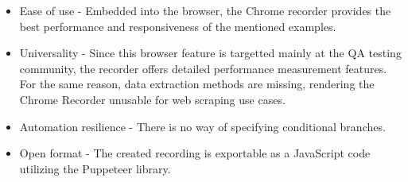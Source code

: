 \begin{itemize}
    \item Ease of use - Embedded into the browser, the Chrome recorder provides the best performance and responsiveness of the mentioned examples.  

    \item Universality - Since this browser feature is targetted mainly at the \ac{QA} testing community, the recorder offers detailed performance measurement features.
    For the same reason, data extraction methods are missing, rendering the Chrome Recorder unusable for web scraping use cases.    

    \item Automation resilience -
    There is no way of specifying conditional branches. 
    
    \item Open format - The created recording is exportable as a JavaScript code utilizing the Puppeteer library.
\end{itemize}
\renewcommand\cellgape{\Gape[4pt]}
